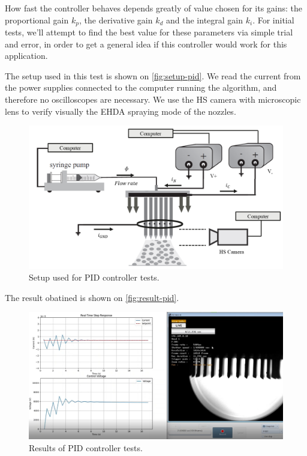 \documentclass[oneside,12pt]{article}
\begin{document}
How fast the controller behaves depends greatly of value chosen for its gains: the proportional gain $k_p$, the derivative gain $k_d$
and the integral gain $k_i$. For initial tests, we'll attempt to find the best value for these parameters via simple trial and error,
in order to get a general idea if this controller would work for this application. 

The setup used in this test is shown on \autoref{fig:setup-pid}. We read the current from the power supplies connected 
to the computer running the algorithm, and therefore no oscilloscopes are necessary. We use the HS camera with microscopic lens to verify 
visually the EHDA spraying mode of the nozzles.

\begin{figure}[h!]
    \centering
    \includegraphics[width=\textwidth,trim=1 1 1 1,clip]{figures/setup-pid.png}
    \caption{Setup used for PID controller tests.}
    \label{fig:setup-pid}
\end{figure}

The result obatined is shown on \autoref{fig:result-pid}.

\begin{figure}[h!]
    \centering
    \includegraphics[width=\textwidth,trim=1 1 1 1,clip]{figures/result-pid.png}
    \caption{Results of PID controller tests.}
    \label{fig:result-pid}
\end{figure}
\end{document}
